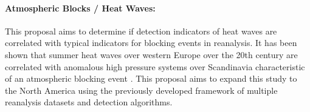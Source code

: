 \documentclass[11pt]{article}
\newcommand\citep{\cite}
\begin{document}





\paragraph{Atmospheric Blocks / Heat Waves:}  This proposal aims to determine if detection indicators of heat waves are correlated with typical indicators for blocking events in reanalysis.  It has been shown that summer heat waves over western Europe over the 20th century are correlated with anomalous high pressure systems over Scandinavia characteristic of an atmospheric blocking event \cite{della2007summer}.  This proposal aims to expand this study to the North America using the previously developed framework of multiple reanalysis datasets and detection algorithms.

\end{document}
